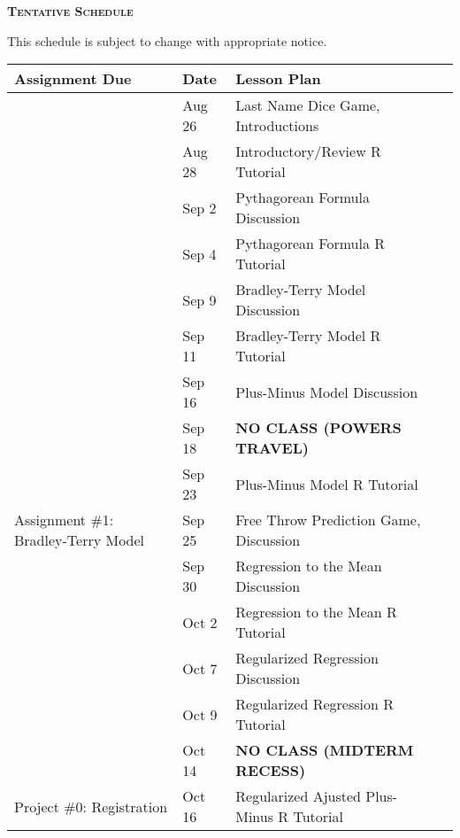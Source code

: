 \documentclass[11pt]{article}
\begin{document}
\newpage
\textbf{\textsc{Tentative Schedule}}\\
\begin{adjustwidth}{1cm}{0cm}
  This schedule is subject to change with appropriate notice.
  \begin{center}
    \begin{tabular}{llll}
      Assignment Due                            & Date    & Lesson Plan\\
      \hline
      \hline
                                                & Aug 26  & Last Name Dice Game, Introductions\\
                                                & Aug 28  & Introductory/Review R Tutorial\\
      \hline
                                                & Sep 2   & Pythagorean Formula Discussion\\
                                                & Sep 4   & Pythagorean Formula R Tutorial\\
      \hline
                                                & Sep 9   & Bradley-Terry Model Discussion\\
                                                & Sep 11  & Bradley-Terry Model R Tutorial\\
      \hline
                                                & Sep 16  & Plus-Minus Model Discussion\\
                                                & Sep 18  & {\bf NO CLASS (POWERS TRAVEL)}\\
      \hline
                                                & Sep 23  & Plus-Minus Model R Tutorial\\
      Assignment \#1: Bradley-Terry Model       & Sep 25  & Free Throw Prediction Game, Discussion\\
      \hline
                                                & Sep 30  & Regression to the Mean Discussion\\
                                                & Oct 2   & Regression to the Mean R Tutorial\\
      \hline
                                                & Oct 7   & Regularized Regression Discussion\\
                                                & Oct 9   & Regularized Regression R Tutorial\\
      \hline
                                                & Oct 14  & {\bf NO CLASS (MIDTERM RECESS)}\\
      Project \#0: Registration                 & Oct 16  & Regularized Ajusted Plus-Minus R Tutorial\\

\end{tabular}
\end{center}
\end{adjustwidth}
\end{document}
